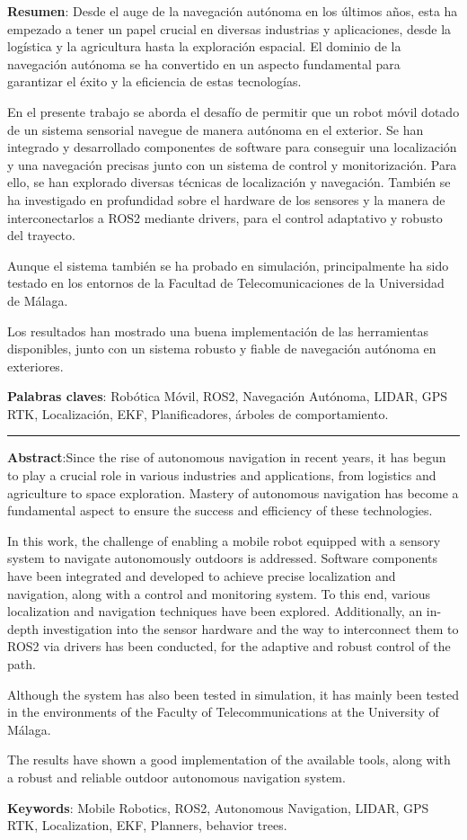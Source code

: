 \textbf{Resumen}:
Desde el auge de la navegación autónoma en los últimos años, esta ha empezado a tener un papel crucial en diversas industrias y aplicaciones, desde la logística y la agricultura hasta la exploración espacial. El dominio de la navegación autónoma se ha convertido en un aspecto fundamental para garantizar el éxito y la eficiencia de estas tecnologías.

En el presente trabajo se aborda el desafío de permitir que un robot móvil dotado de un sistema sensorial navegue de manera autónoma en el exterior. Se han integrado y desarrollado componentes de software para conseguir una localización y una navegación precisas junto con un sistema de control y monitorización. Para ello, se han explorado diversas técnicas de localización y navegación. También se ha investigado en profundidad sobre el hardware de los sensores y la manera de interconectarlos a ROS2 mediante drivers, para el control adaptativo y robusto del trayecto.

Aunque el sistema también se ha probado en simulación, principalmente ha sido testado en los entornos de la Facultad de Telecomunicaciones de la Universidad de Málaga.

Los resultados han mostrado una buena implementación de las herramientas disponibles, junto con un sistema robusto y fiable de navegación autónoma en exteriores.

\textbf{Palabras claves}: Robótica Móvil, ROS2, Navegación Autónoma, LIDAR, GPS RTK, Localización, EKF, Planificadores, árboles de comportamiento. 

\vspace{1cm}
\begin{center}
  \rule{0.5\textwidth}{.4pt}
\end{center}
\vspace{1cm}

\textbf{Abstract}:Since the rise of autonomous navigation in recent years, it has begun to play a crucial role in various industries and applications, from logistics and agriculture to space exploration. Mastery of autonomous navigation has become a fundamental aspect to ensure the success and efficiency of these technologies.

In this work, the challenge of enabling a mobile robot equipped with a sensory system to navigate autonomously outdoors is addressed. Software components have been integrated and developed to achieve precise localization and navigation, along with a control and monitoring system. To this end, various localization and navigation techniques have been explored. Additionally, an in-depth investigation into the sensor hardware and the way to interconnect them to ROS2 via drivers has been conducted, for the adaptive and robust control of the path.

Although the system has also been tested in simulation, it has mainly been tested in the environments of the Faculty of Telecommunications at the University of Málaga.

The results have shown a good implementation of the available tools, along with a robust and reliable outdoor autonomous navigation system.

\textbf{Keywords}: Mobile Robotics, ROS2, Autonomous Navigation, LIDAR, GPS RTK, Localization, EKF, Planners, behavior trees.
